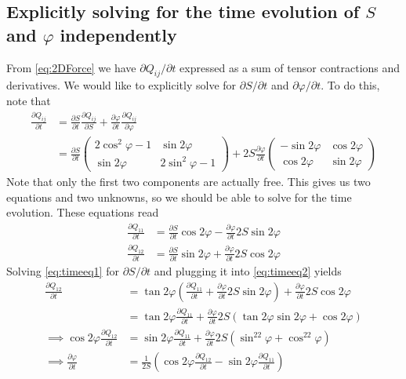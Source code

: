 \documentclass[reqno]{article}
\begin{document}
	\subsection{Explicitly solving for the time evolution of $S$ and $\varphi$ independently}
	From \eqref{eq:2DForce} we have $\partial Q_{ij}/\partial t$ expressed as a sum of tensor contractions and derivatives. We would like to explicitly solve for $\partial S/\partial t$ and $\partial \varphi/\partial t$. To do this, note that
	\begin{equation}
	\begin{split}
		\frac{\partial Q_{ij}}{\partial t} &= \frac{\partial S}{\partial t} \frac{\partial Q_{ij}}{\partial S} + \frac{\partial \varphi}{\partial t} \frac{\partial Q_{ij}}{\partial \varphi} \\
		&= \frac{\partial S}{\partial t}
		\begin{pmatrix}
			2\cos^2\varphi - 1 & \sin2\varphi \\
			\sin2\varphi & 2\sin^2\varphi - 1
		\end{pmatrix}
		+ 2S\frac{\partial \varphi}{\partial t}
		\begin{pmatrix}
			-\sin2\varphi & \cos2\varphi \\
			\cos2\varphi & \sin2\varphi
		\end{pmatrix}
	\end{split}
	\end{equation}
	Note that only the first two components are actually free. This gives us two equations and two unknowns, so we should be able to solve for the time evolution. These equations read
	\begin{align}
		\frac{\partial Q_{11}}{\partial t} &= \frac{\partial S}{\partial t}\cos2\varphi - \frac{\partial \varphi}{\partial t} 2S\sin2\varphi
		\label{eq:timeeq1} \\
		\frac{\partial Q_{12}}{\partial t} &= \frac{\partial S}{\partial t} \sin2\varphi + \frac{\partial \varphi}{\partial t} 2S\cos2\varphi \label{eq:timeeq2}
	\end{align}
	Solving \eqref{eq:timeeq1} for $\partial S/\partial t$ and plugging it into \eqref{eq:timeeq2} yields
	\begin{equation}
	\begin{split}
		\frac{\partial Q_{12}}{\partial t} &= \tan2\varphi\left( \frac{\partial Q_{11}}{\partial t} + \frac{\partial \varphi}{\partial t} 2S\sin2\varphi \right) + \frac{\partial \varphi}{\partial t} 2S \cos2\varphi \\
		&= \tan2\varphi \frac{\partial Q_{11}}{\partial t} + \frac{\partial \varphi}{\partial t}2S\left( \tan2\varphi\sin2\varphi + \cos2\varphi \right) \\
		\implies \cos2\varphi \frac{\partial Q_{12}}{\partial t} &= \sin2\varphi \frac{\partial Q_{11}}{\partial t} + \frac{\partial \varphi}{\partial t} 2S\left( \sin^22\varphi + \cos^22\varphi \right) \\
		\implies \frac{\partial \varphi}{\partial t} &= \frac{1}{2S}\left( \cos2\varphi \frac{\partial Q_{12}}{\partial t} - \sin2\varphi \frac{\partial Q_{11}}{\partial t} \right)
	\end{split}
	\end{equation}
\end{document}
